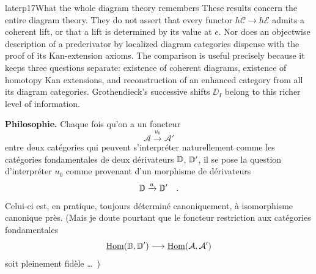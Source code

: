 \begin{dcomment}{later}{p17}{What the whole diagram theory remembers}
These results concern the entire diagram theory. They do not assert that every functor $h\mathcal C\to h\mathcal E$ admits a coherent lift, or that a lift is determined by its value at $e$. Nor does an objectwise description of a prederivator by localized diagram categories dispense with the proof of its Kan-extension axioms. The comparison is useful precisely because it keeps three questions separate: existence of coherent diagrams, existence of homotopy Kan extensions, and reconstruction of an enhanced category from all its diagram categories. Grothendieck's successive shifts $\DD_I$ belong to this richer level of information.
\end{dcomment}


\textbf{Philosophie.} Chaque fois qu'on a un foncteur
\[
\mathcal{A} \xrightarrow{u_0} \mathcal{A}'
\]
entre deux catégories qui peuvent s'interpréter naturellement comme les catégories fondamentales de deux dérivateurs $\mathbb{D}$, $\mathbb{D}'$, il se pose la question d'interpréter $u_0$ comme provenant d'un morphisme de dérivateurs
\[
\mathbb{D} \xrightarrow{u} \mathbb{D}' \quad .
\]
Celui-ci est, en pratique, toujours déterminé canoniquement, à isomorphisme canonique près. (Mais je doute pourtant que le foncteur restriction aux catégories fondamentales
\[
\underline{\operatorname{Hom}}(\mathbb{D},\mathbb{D}') \longrightarrow \underline{\operatorname{Hom}}(\mathcal{A},\mathcal{A}')
\]
soit pleinement fidèle \dots\ )

